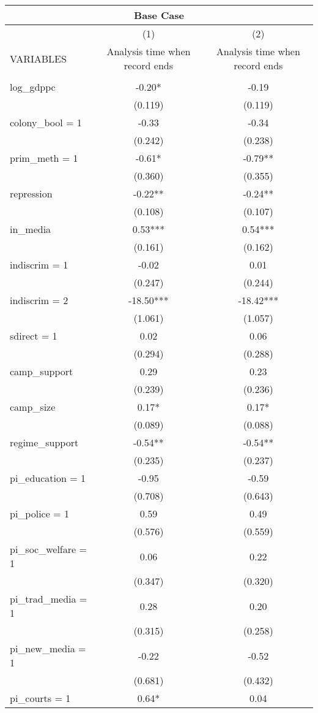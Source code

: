 \documentclass[]{article}
\begin{document}
\begin{tabular}{lcc}
\multicolumn{3}{c}{Base Case} \\ \hline
 & (1) & (2) \\
VARIABLES & Analysis time when record ends & Analysis time when record ends \\ \hline
 &  &  \\
log\_gdppc & -0.20* & -0.19 \\
 & (0.119) & (0.119) \\
colony\_bool = 1 & -0.33 & -0.34 \\
 & (0.242) & (0.238) \\
prim\_meth = 1 & -0.61* & -0.79** \\
 & (0.360) & (0.355) \\
repression & -0.22** & -0.24** \\
 & (0.108) & (0.107) \\
in\_media & 0.53*** & 0.54*** \\
 & (0.161) & (0.162) \\
indiscrim = 1 & -0.02 & 0.01 \\
 & (0.247) & (0.244) \\
indiscrim = 2 & -18.50*** & -18.42*** \\
 & (1.061) & (1.057) \\
sdirect = 1 & 0.02 & 0.06 \\
 & (0.294) & (0.288) \\
camp\_support & 0.29 & 0.23 \\
 & (0.239) & (0.236) \\
camp\_size & 0.17* & 0.17* \\
 & (0.089) & (0.088) \\
regime\_support & -0.54** & -0.54** \\
 & (0.235) & (0.237) \\
pi\_education = 1 & -0.95 & -0.59 \\
 & (0.708) & (0.643) \\
pi\_police = 1 & 0.59 & 0.49 \\
 & (0.576) & (0.559) \\
pi\_soc\_welfare = 1 & 0.06 & 0.22 \\
 & (0.347) & (0.320) \\
pi\_trad\_media = 1 & 0.28 & 0.20 \\
 & (0.315) & (0.258) \\
pi\_new\_media = 1 & -0.22 & -0.52 \\
 & (0.681) & (0.432) \\
pi\_courts = 1 & 0.64* & 0.04 \\

\end{tabular}
\end{document}
